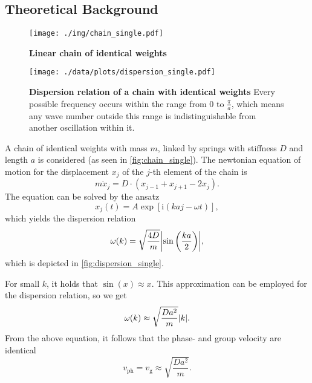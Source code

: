 \subsection{Theoretical Background}
\begin{figure}[tbp]
	\centering
	\texttt{[image: ./img/chain\_single.pdf]}
	\caption[Chain of Identical Weights]{\textbf{Linear chain of identical weights}}
	\label{fig:chain_single}
\end{figure}
\begin{figure}[tbp]
	\centering
	\texttt{[image: ./data/plots/dispersion\_single.pdf]}
	\caption[Dispersion Relation of Chain With Identical Weights]{\textbf{Dispersion relation of a chain with identical weights} Every possible frequency occurs within the range from 0 to $\frac{\pi}{a}$, which means any wave number outside this range is indistinguishable from another oscillation within it.}
	\label{fig:dispersion_single}
\end{figure}
A chain of identical weights with mass $m$, linked by springs with stiffness $D$ and length $a$ is considered (as seen in \autoref{fig:chain_single}).
The newtonian equation of motion for the displacement $x_j$ of the $j$-th element of the chain is
\begin{equation*}
	m \ddot x_j = D \cdot \left(x_{j - 1} + x_{j + 1} - 2 x_j \right).
\end{equation*}
The equation can be solved by the ansatz
\begin{equation*}
	x_j(t) = A \exp\left[\text{i} \left(k a j - \omega t\right)\right],
\end{equation*}
which yields the dispersion relation
\begin{equation}
	\omega(k) = \sqrt{\frac{4D}{m}}\abs{\sin\left(\frac{ka}{2}\right)},
\end{equation}
which is depicted in \autoref{fig:dispersion_single}.

For small $k$, it holds that $\sin(x)\approx x$.
This approximation can be employed for the dispersion relation, so we get
\begin{equation*}
	\omega(k)\approx \sqrt{\frac{Da^2}{m}}\abs{k}.
\end{equation*}
From the above equation, it follows that the phase- and group velocity are identical
\begin{equation}\label{eq:sound_single}
	v_\text{ph} = v_\text{g}\approx \sqrt{\frac{Da^2}{m}}.
\end{equation}

